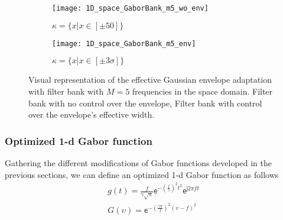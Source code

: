 \begin{figure}[!ht] 
	\centering
	\begin{subfigure}[b]{0.45\textwidth}
		\centering
		\texttt{[image: 1D\_space\_GaborBank\_m5\_wo\_env]}
		\caption{$\kappa = \lbrace x | x \in [\pm 50] \rbrace$}
		\label{fig:1D_space_Gaborfilterbank_wo_env}
	\end{subfigure}
	\qquad %
	\begin{subfigure}[b]{0.45\textwidth}
		\centering
		\texttt{[image: 1D\_space\_GaborBank\_m5\_env]}
		\caption{$\kappa = \lbrace x | x \in [\pm 3\sigma] \rbrace$}
		\label{fig:1D_space_Gaborfilterbank_env}
	\end{subfigure}

  \caption{Visual representation of the effective Gaussian envelope adaptation with filter bank with $M = 5$ frequencies in the space domain.  Filter bank with no control over the envelope,  Filter bank with control over the envelope's effective width.}
  \label{fig:1D_space_Gaborfilterbank}
\end{figure}


\subsubsection{Optimized 1-d Gabor function}
Gathering the different modifications of Gabor functions developed in the previous sections, we can define an optimized 1-d Gabor function as follows
\begin{equation}\label{eq:gabor_function_1d_timefreq_bank}
    \begin{gathered}
         g(t) =  \frac{f}{\gamma \sqrt{\pi}} \mathsf{e}^{-\left(\frac{f}{\gamma}\right)^2 t^2} \mathsf{e}^{\mathsf{j} 2 \pi f t } \\
         G(\upsilon) =  \mathsf{e}^{-\left(\frac{\gamma \pi}{f}\right) ^2 (\upsilon-f)^2}
     \end{gathered}
\end{equation}

